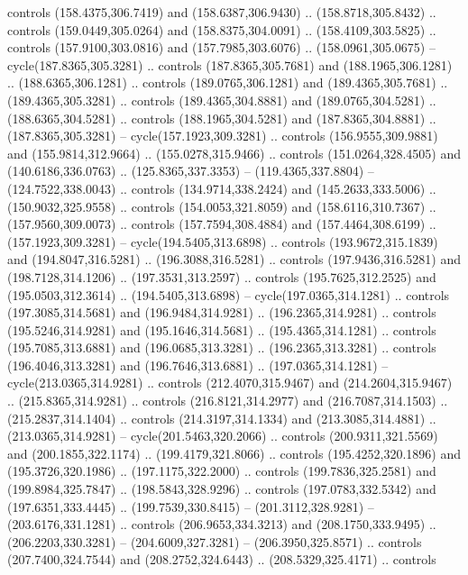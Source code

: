 \begin{scope}[cm={{1.25,0.0,0.0,-1.25,(0.0,743.43331)}}]
    controls (158.4375,306.7419) and (158.6387,306.9430) .. (158.8718,305.8432) ..
    controls (159.0449,305.0264) and (158.8375,304.0091) .. (158.4109,303.5825) ..
    controls (157.9100,303.0816) and (157.7985,303.6076) .. (158.0961,305.0675) --
    cycle(187.8365,305.3281) .. controls (187.8365,305.7681) and
    (188.1965,306.1281) .. (188.6365,306.1281) .. controls (189.0765,306.1281) and
    (189.4365,305.7681) .. (189.4365,305.3281) .. controls (189.4365,304.8881) and
    (189.0765,304.5281) .. (188.6365,304.5281) .. controls (188.1965,304.5281) and
    (187.8365,304.8881) .. (187.8365,305.3281) -- cycle(157.1923,309.3281) ..
    controls (156.9555,309.9881) and (155.9814,312.9664) .. (155.0278,315.9466) ..
    controls (151.0264,328.4505) and (140.6186,336.0763) .. (125.8365,337.3353) --
    (119.4365,337.8804) -- (124.7522,338.0043) .. controls (134.9714,338.2424) and
    (145.2633,333.5006) .. (150.9032,325.9558) .. controls (154.0053,321.8059) and
    (158.6116,310.7367) .. (157.9560,309.0073) .. controls (157.7594,308.4884) and
    (157.4464,308.6199) .. (157.1923,309.3281) -- cycle(194.5405,313.6898) ..
    controls (193.9672,315.1839) and (194.8047,316.5281) .. (196.3088,316.5281) ..
    controls (197.9436,316.5281) and (198.7128,314.1206) .. (197.3531,313.2597) ..
    controls (195.7625,312.2525) and (195.0503,312.3614) .. (194.5405,313.6898) --
    cycle(197.0365,314.1281) .. controls (197.3085,314.5681) and
    (196.9484,314.9281) .. (196.2365,314.9281) .. controls (195.5246,314.9281) and
    (195.1646,314.5681) .. (195.4365,314.1281) .. controls (195.7085,313.6881) and
    (196.0685,313.3281) .. (196.2365,313.3281) .. controls (196.4046,313.3281) and
    (196.7646,313.6881) .. (197.0365,314.1281) -- cycle(213.0365,314.9281) ..
    controls (212.4070,315.9467) and (214.2604,315.9467) .. (215.8365,314.9281) ..
    controls (216.8121,314.2977) and (216.7087,314.1503) .. (215.2837,314.1404) ..
    controls (214.3197,314.1334) and (213.3085,314.4881) .. (213.0365,314.9281) --
    cycle(201.5463,320.2066) .. controls (200.9311,321.5569) and
    (200.1855,322.1174) .. (199.4179,321.8066) .. controls (195.4252,320.1896) and
    (195.3726,320.1986) .. (197.1175,322.2000) .. controls (199.7836,325.2581) and
    (199.8984,325.7847) .. (198.5843,328.9296) .. controls (197.0783,332.5342) and
    (197.6351,333.4445) .. (199.7539,330.8415) -- (201.3112,328.9281) --
    (203.6176,331.1281) .. controls (206.9653,334.3213) and (208.1750,333.9495) ..
    (206.2203,330.3281) -- (204.6009,327.3281) -- (206.3950,325.8571) .. controls
    (207.7400,324.7544) and (208.2752,324.6443) .. (208.5329,325.4171) .. controls

\end{scope}
